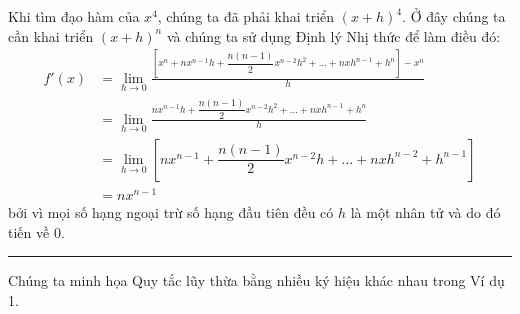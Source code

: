 \begin{minipage}[t]{0.71\textwidth}
    Khi tìm đạo hàm của $x^4$, chúng ta đã phải khai triển $(x + h)^4$. Ở đây chúng ta cần khai triển $(x + h)^n$ và chúng ta sử dụng Định lý Nhị thức để làm điều đó:
    \begin{align*}
    f'(x) &= \lim_{h \to 0} \frac{\left[ x^n + nx^{n-1}h + \dfrac{n(n - 1)}{2}x^{n-2}h^2 + \dots + nxh^{n-1} + h^n \right] - x^n}{h} \\[7pt]
    &= \lim_{h \to 0} \frac{nx^{n-1}h + \dfrac{n(n - 1)}{2}x^{n-2}h^2 + \dots + nxh^{n-1} + h^n}{h} \\[7pt]
    &= \lim_{h \to 0} \left[ nx^{n-1} + \dfrac{n(n - 1)}{2}x^{n-2}h + \dots + nxh^{n-2} + h^{n-1} \right] \\[7pt]
    &= nx^{n-1}
    \end{align*}
    bởi vì mọi số hạng ngoại trừ số hạng đầu tiên đều có $h$ là một nhân tử và do đó tiến về 0.\hfill{\color{stewartred}\rule{1.2ex}{1.2ex}}

    \vspace{4pt}
    Chúng ta minh họa Quy tắc lũy thừa bằng nhiều ký hiệu khác nhau trong Ví dụ 1.
\end{minipage}
